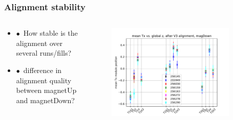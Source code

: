 \documentclass[aspectratio=1610, 12pt]{beamer}
\begin{document}
\begin{frame}\frametitle{Alignment stability}
  \begin{columns}
    \begin{column}[c]{0.48\textwidth}
      \begin{itemize}
        \item $\bullet$\, How stable is the alignment over several runs/fills?
        \item $\bullet$\, difference in alignment quality between magnetUp and magnetDown?
      \end{itemize}
    \end{column}
    \begin{column}[c]{0.48\textwidth}
      \begin{figure}
        \includegraphics[width=0.9\textwidth]{plots/all_runs_global_z_vs_Tx.pdf}
      \end{figure}
    \end{column}
  \end{columns}
\end{frame}
\end{document}

